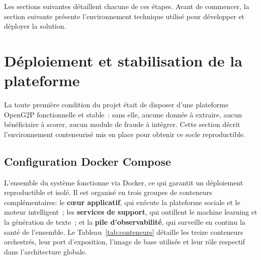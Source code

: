 \documentclass[a4paper, oneside, 12pt]{book}
\begin{document}
\hspace{0.5cm}Les sections suivantes détaillent chacune de ces étapes. Avant de commencer, la section suivante présente l'environnement technique utilisé pour développer et déployer la solution.
\section{Déploiement et stabilisation de la plateforme}

\hspace{0.5cm}La toute première condition du projet était de disposer d'une plateforme OpenG2P fonctionnelle et stable~: sans elle, aucune donnée à extraire, aucun bénéficiaire à scorer, aucun module de fraude à intégrer. Cette section décrit l'environnement conteneurisé mis en place pour obtenir ce socle reproductible.


\subsection{Configuration Docker Compose}

\hspace{0.5cm}L'ensemble du système fonctionne via Docker, ce qui garantit un déploiement reproductible et isolé. Il est organisé en trois groupes de conteneurs complémentaires: le \textbf{cœur applicatif}, qui exécute la plateforme sociale et le moteur intelligent~; les \textbf{services de support}, qui outillent le machine learning et la génération de texte~; et la \textbf{pile d'observabilité}, qui surveille en continu la santé de l'ensemble. Le Tableau~\ref{tab:conteneurs} détaille les treize conteneurs orchestrés, leur port d'exposition, l'image de base utilisée et leur rôle respectif dans l'architecture globale.
\end{document}
